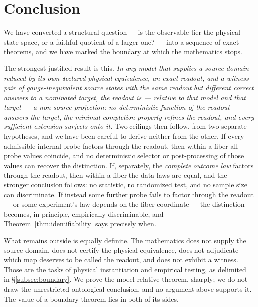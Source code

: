 \documentclass[11pt,reqno]{amsart}
\theoremstyle{plain}
\theoremstyle{definition}
\theoremstyle{remark}
\begin{document}
\section{Conclusion}\label{sec:conclusion}

We have converted a structural question --- is the observable tier the physical state space, or a faithful quotient of a larger one? --- into a sequence of exact theorems, and we have marked the boundary at which the mathematics stops.

The strongest justified result is this. \emph{In any model that supplies a source domain reduced by its own declared physical equivalence, an exact readout, and a witness pair of gauge-inequivalent source states with the same readout but different correct answers to a nominated target, the readout is --- relative to that model and that target --- a non-source projection: no deterministic function of the readout answers the target, the minimal completion properly refines the readout, and every sufficient extension surjects onto it.} Two ceilings then follow, from two separate hypotheses, and we have been careful to derive neither from the other. If every admissible internal probe factors through the readout, then within a fiber all probe values coincide, and no deterministic selector or post-processing of those values can recover the distinction. If, separately, the \emph{complete outcome law} factors through the readout, then within a fiber the data laws are equal, and the stronger conclusion follows: no statistic, no randomized test, and no sample size can discriminate. If instead some further probe fails to factor through the readout --- or some experiment's law depends on the fiber coordinate --- the distinction becomes, in principle, empirically discriminable, and Theorem~\ref{thm:identifiability} says precisely when.

What remains outside is equally definite. The mathematics does not supply the source domain, does not certify the physical equivalence, does not adjudicate which map deserves to be called the readout, and does not exhibit a witness. Those are the tasks of physical instantiation and empirical testing, as delimited in \S\ref{subsec:boundary}. We prove the model-relative theorem, sharply; we do not draw the unrestricted ontological conclusion, and no argument above supports it. The value of a boundary theorem lies in both of its sides.
\end{document}
